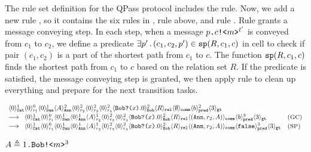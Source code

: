 The rule set definition for the QPass protocol includes the  rule. Now, we add a new rule ,
so it contains the six rules in , rule  above, and rule .
Rule  grants a message conveying step. In each step, when a message $p\texttt{.}c\texttt{!<}m\texttt{>}^{t'}$ is conveyed from $c_1$ to $c_2$,
we define a predicate $\exists p'\,.\,(c_1,c_2,p')\in \texttt{sp}(R,c_1,c)$ in cell  to check if pair $(c_1,c_2)$ is a part of the shortest path from $c_1$ to $c$. The function $\texttt{sp}(R,c_1,c)$ finds the shortest path from $c_1$ to $c$ based on the relation set $R$.
If the predicate is satisfied, the message conveying step is granted, we then apply rule  to clean up everything and prepare for the next transition tasks.

{\footnotesize
\begin{center}
\[
\begin{array}{ll}
\langle 0 \rangle^{1}_{\texttt{Cat}}
\langle 0 \rangle^{0}_{r_1}
\langle 0 \rangle^{1}_{\texttt{Dan}}
\langle A \rangle^{2}_{\texttt{Ann}}
\langle 0 \rangle^{2}_{r_2}
\langle 0 \rangle^{2}_{r_3}
\langle 0 \rangle^{2}_{r_4}
\langle \texttt{Bob}\texttt{?(}x\texttt{)}.0 \rangle^{2}_{\texttt{Bob}}
\langle R \rangle_{\texttt{rel}}
\langle \emptyset \rangle_{\texttt{comm}}
\langle b \rangle^{2}_{\texttt{pred}}
\langle 3 \rangle_{\texttt{gt}}
\\[0.2em]
\longrightarrow
\;\;
\langle 0 \rangle^{1}_{\texttt{Cat}}
\langle 0 \rangle^{0}_{r_1}
\langle 0 \rangle^{1}_{\texttt{Dan}}
\langle 0 \rangle^{1}_{\texttt{Ann}}
\langle A \rangle^{1}_{r_2}
\langle 0 \rangle^{2}_{r_3}
\langle 0 \rangle^{2}_{r_4}
\langle \texttt{Bob}\texttt{?(}x\texttt{)}.0 \rangle^{2}_{\texttt{Bob}}
\langle R \rangle_{\texttt{rel}}
\langle (\texttt{Ann},r_2,A) \rangle_{\texttt{comm}}
\langle b \rangle^{3}_{\texttt{pred}}
\langle 3 \rangle_{\texttt{gt}}
&
({\small \textsc{GC}})
\\[0.2em]
\longrightarrow
\;\;
\langle 0 \rangle^{1}_{\texttt{Cat}}
\langle 0 \rangle^{0}_{r_1}
\langle 0 \rangle^{1}_{\texttt{Dan}}
\langle 0 \rangle^{1}_{\texttt{Ann}}
\langle A \rangle^{1}_{r_2}
\langle 0 \rangle^{2}_{r_3}
\langle 0 \rangle^{2}_{r_4}
\langle \texttt{Bob}\texttt{?(}x\texttt{)}.0 \rangle^{2}_{\texttt{Bob}}
\langle R \rangle_{\texttt{rel}}
\langle (\texttt{Ann},r_2,A) \rangle_{\texttt{comm}}
\langle \texttt{false} \rangle^{3}_{\texttt{pred}}
\langle 3 \rangle_{\texttt{gt}}
&
({\small \textsc{SP}})
\end{array}
\]
\end{center}
}
{\footnotesize
\begin{center}
$A\triangleq1\texttt{.}\texttt{Bob}\texttt{!<}m\texttt{>}^3
$
\end{center}
}

